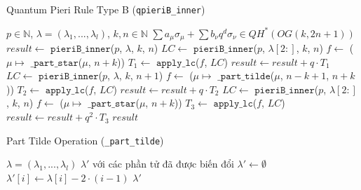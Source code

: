 \begin{algorithm}[H]
\caption{Quantum Pieri Rule Type B (\texttt{qpieriB\_inner})}
\begin{algorithmic}[1]
\REQUIRE $p \in \mathbb{N}$, $\lambda = (\lambda_1, ..., \lambda_l)$, $k, n \in \mathbb{N}$
\ENSURE $\sum a_\mu \sigma_\mu + \sum b_\nu q^d \sigma_\nu \in QH^*(OG(k,2n+1))$
\STATE $result \gets$ $\mathtt{pieriB\_inner}$($p$, $\lambda$, $k$, $n$)
        \STATE $LC \gets$ $\mathtt{pieriB\_inner}$($p$, $\lambda[2:]$, $k$, $n$)
        \STATE $f \gets$ ($\mu \mapsto$ $\mathtt{\_part\_star}$($\mu$, $n+k$))
        \STATE $T_1 \gets$ $\mathtt{apply\_lc}$($f$, $LC$)
        \STATE $result \gets result + q \cdot T_1$
    \ENDIF
\ELSE
        \STATE $LC \gets$ $\mathtt{pieriB\_inner}$($p$, $\lambda$, $k$, $n+1$)
        \STATE $f \gets$ ($\mu \mapsto$ $\mathtt{\_part\_tilde}$($\mu$, $n-k+1$, $n+k$))
        \STATE $T_2 \gets$ $\mathtt{apply\_lc}$($f$, $LC$)
        \STATE $result \gets result + q \cdot T_2$
    \ENDIF
        \STATE $LC \gets$ $\mathtt{pieriB\_inner}$($p$, $\lambda[2:]$, $k$, $n$)
        \STATE $f \gets$ ($\mu \mapsto$ $\mathtt{\_part\_star}$($\mu$, $n+k$))
        \STATE $T_3 \gets$ $\mathtt{apply\_lc}$($f$, $LC$)
        \STATE $result \gets result + q^2 \cdot T_3$
    \ENDIF
\ENDIF
\RETURN $result$
\end{algorithmic}
\end{algorithm}

\begin{algorithm}[H]
\caption{Part Tilde Operation (\texttt{\_part\_tilde})}
\begin{algorithmic}[1]
\REQUIRE $\lambda = (\lambda_1, ..., \lambda_l)$
\ENSURE $\lambda'$ với các phần tử đã được biến đổi
\STATE $\lambda' \gets \emptyset$
    \STATE $\lambda'[i] \gets \lambda[i] - 2 \cdot (i-1)$
\ENDFOR
\RETURN $\lambda'$
\end{algorithmic}
\end{algorithm}
